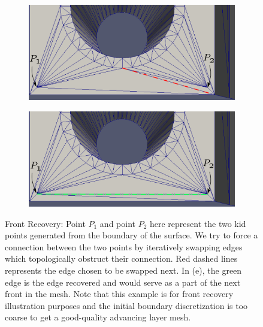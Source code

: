 \documentclass[conf]{new-aiaa}
\begin{document}
\begin{figure}[hbt!]
\begin{subfigure}{.5\textwidth}
  \caption{}
  \label{force-swap3}
\end{subfigure}%
\begin{subfigure}{.5\textwidth}
  \centering
  \includegraphics[width=.9\linewidth]{force-swapping-edge-recovery/swap3-edited.eps}
  \caption{}
  \label{force-swap4}
\end{subfigure}
\begin{subfigure}{.5\textwidth}
  \centering
  \includegraphics[width=.9\linewidth]{force-swapping-edge-recovery/swap4-edited.eps}
  \caption{}
  \label{force-swap5}
\end{subfigure}
\caption{Front Recovery: Point $P_1$ and point $P_2$ here represent the two kid points generated from the boundary of the surface. We try to force a connection between the two points by iteratively swapping edges which topologically obstruct their connection. Red dashed lines represents the edge chosen to be swapped next. In (e), the green edge is the edge recovered and would serve as a part of the next front in the mesh. Note that this example is for front recovery illustration purposes and the initial boundary discretization is too coarse to get a good-quality advancing layer mesh.}
\label{force-swap}
\end{figure}
\end{document}
